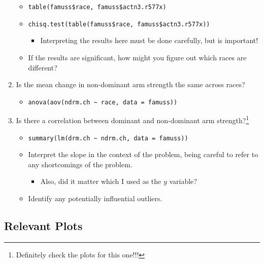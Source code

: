 \documentclass[
  letterpaper,
  DIV=11,
  numbers=noendperiod,
  oneside]{scrreprt}
\providecommand{\tightlist}{%
  \setlength{\itemsep}{0pt}\setlength{\parskip}{0pt}}\usepackage{longtable,booktabs,array}
\begin{document}
\begin{enumerate}
  \begin{itemize}
  \tightlist
  \item
    \texttt{table(famuss\$race,\ famuss\$actn3.r577x)}
  \item
    \texttt{chisq.test(table(famuss\$race,\ famuss\$actn3.r577x))}

    \begin{itemize}
    \tightlist
    \item
      Interpreting the results here must be done carefully, but is
      important!
    \end{itemize}
  \item
    If the results are significant, how might you figure out which races
    are different?
  \end{itemize}
\item
  Is the mean change in non-dominant arm strength the same across races?

  \begin{itemize}
  \tightlist
  \item
    \texttt{anova(aov(ndrm.ch\ \textasciitilde{}\ race,\ data\ =\ famuss))}
  \end{itemize}
\item
  Is there a correlation between dominant and non-dominant arm
  strength?\footnote{Definitely check the plots for this one!!!}

  \begin{itemize}
  \tightlist
  \item
    \texttt{summary(lm(drm.ch\ \textasciitilde{}\ ndrm.ch,\ data\ =\ famuss))}
  \item
    Interpret the slope in the context of the problem, being careful to
    refer to any shortcomings of the problem.

    \begin{itemize}
    \tightlist
    \item
      Also, did it matter which I used as the \(y\) variable?
    \end{itemize}
  \item
    Identify any potentially influential outliers.
  \end{itemize}
\end{enumerate}

\hypertarget{relevant-plots}{%
\subsection{Relevant Plots}\label{relevant-plots}}
\end{document}
